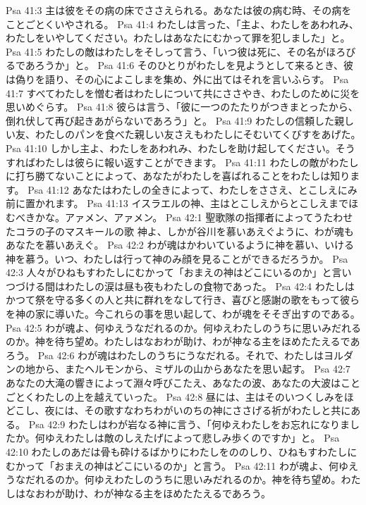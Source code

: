 Psa 41:3  主は彼をその病の床でささえられる。あなたは彼の病む時、その病をことごとくいやされる。
Psa 41:4  わたしは言った、「主よ、わたしをあわれみ、わたしをいやしてください。わたしはあなたにむかって罪を犯しました」と。
Psa 41:5  わたしの敵はわたしをそしって言う、「いつ彼は死に、その名がほろびるであろうか」と。
Psa 41:6  そのひとりがわたしを見ようとして来るとき、彼は偽りを語り、その心によこしまを集め、外に出てはそれを言いふらす。
Psa 41:7  すべてわたしを憎む者はわたしについて共にささやき、わたしのために災を思いめぐらす。
Psa 41:8  彼らは言う、「彼に一つのたたりがつきまとったから、倒れ伏して再び起きあがらないであろう」と。
Psa 41:9  わたしの信頼した親しい友、わたしのパンを食べた親しい友さえもわたしにそむいてくびすをあげた。
Psa 41:10  しかし主よ、わたしをあわれみ、わたしを助け起してください。そうすればわたしは彼らに報い返すことができます。
Psa 41:11  わたしの敵がわたしに打ち勝てないことによって、あなたがわたしを喜ばれることをわたしは知ります。
Psa 41:12  あなたはわたしの全きによって、わたしをささえ、とこしえにみ前に置かれます。
Psa 41:13  イスラエルの神、主はとこしえからとこしえまでほむべきかな。アァメン、アァメン。
Psa 42:1  聖歌隊の指揮者によってうたわせたコラの子のマスキールの歌 神よ、しかが谷川を慕いあえぐように、わが魂もあなたを慕いあえぐ。
Psa 42:2  わが魂はかわいているように神を慕い、いける神を慕う。いつ、わたしは行って神のみ顔を見ることができるだろうか。
Psa 42:3  人々がひねもすわたしにむかって「おまえの神はどこにいるのか」と言いつづける間はわたしの涙は昼も夜もわたしの食物であった。
Psa 42:4  わたしはかつて祭を守る多くの人と共に群れをなして行き、喜びと感謝の歌をもって彼らを神の家に導いた。今これらの事を思い起して、わが魂をそそぎ出すのである。
Psa 42:5  わが魂よ、何ゆえうなだれるのか。何ゆえわたしのうちに思いみだれるのか。神を待ち望め。わたしはなおわが助け、わが神なる主をほめたたえるであろう。
Psa 42:6  わが魂はわたしのうちにうなだれる。それで、わたしはヨルダンの地から、またヘルモンから、ミザルの山からあなたを思い起す。
Psa 42:7  あなたの大滝の響きによって淵々呼びこたえ、あなたの波、あなたの大波はことごとくわたしの上を越えていった。
Psa 42:8  昼には、主はそのいつくしみをほどこし、夜には、その歌すなわちわがいのちの神にささげる祈がわたしと共にある。
Psa 42:9  わたしはわが岩なる神に言う、「何ゆえわたしをお忘れになりましたか。何ゆえわたしは敵のしえたげによって悲しみ歩くのですか」と。
Psa 42:10  わたしのあだは骨も砕けるばかりにわたしをののしり、ひねもすわたしにむかって「おまえの神はどこにいるのか」と言う。
Psa 42:11  わが魂よ、何ゆえうなだれるのか。何ゆえわたしのうちに思いみだれるのか。神を待ち望め。わたしはなおわが助け、わが神なる主をほめたたえるであろう。
